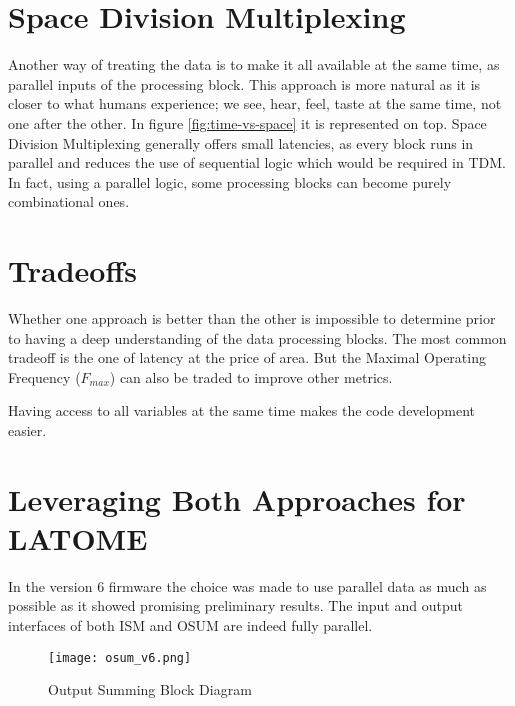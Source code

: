 \section{Space Division Multiplexing}
Another way of treating the data is to make it all available at the same time, as parallel inputs of the processing block. This approach
is more natural as it is closer to what humans experience; we see, hear, feel, taste at the same time, not one after the other. In figure \ref{fig:time-vs-space}
it is represented on top. Space Division Multiplexing generally offers small latencies, as every block runs in parallel and reduces the use of 
sequential logic which would be required in TDM. In fact, using a parallel logic, some processing blocks can become purely combinational ones.

\section{Tradeoffs}\label{sec:space-versus-time-division-multiplexing}
Whether one approach is better than the other is impossible to determine prior to having a deep understanding of the data processing blocks.
The most common tradeoff is the one of latency at the price of area. But the Maximal Operating Frequency (\(F_{max}\)) can also be traded to 
improve other metrics.

Having access to all variables at the same time makes the code development easier.


\section{Leveraging Both Approaches for LATOME}
In the version 6 firmware the choice was made to use parallel data as much as possible as it showed promising preliminary results. The input and output interfaces of both ISM and OSUM are indeed fully parallel.

\begin{figure}
    \centering
    \texttt{[image: osum\_v6.png]}
    \caption{Output Summing Block Diagram}
    \label{fig:osum-v6}
\end{figure}

